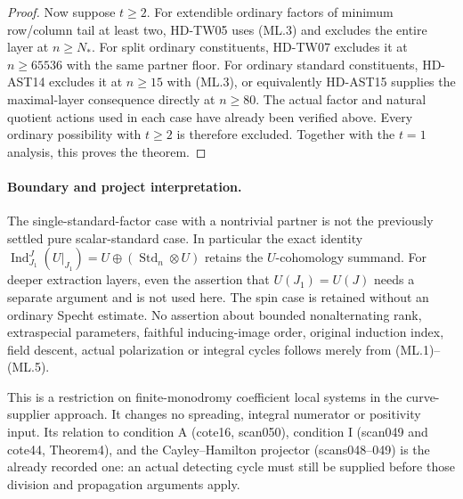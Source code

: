 \begin{proof}
Now suppose $t\ge2$. For extendible ordinary factors of minimum
row/column tail at least two, HD-TW05 uses (ML.3) and excludes the
entire layer at $n\ge N_*$. For split ordinary constituents,
HD-TW07 excludes it at $n\ge65536$ with the same partner floor.
For ordinary standard constituents, HD-AST14 excludes it at
$n\ge15$ with (ML.3), or equivalently HD-AST15 supplies the
maximal-layer consequence directly at $n\ge80$. The actual
factor and natural quotient actions used in each case have
already been verified above. Every ordinary possibility with
$t\ge2$ is therefore excluded. Together with the $t=1$ analysis,
this proves the theorem.
\end{proof}

\paragraph{Boundary and project interpretation.}
The single-standard-factor case with a nontrivial partner is not
the previously settled pure scalar-standard case. In particular
the exact identity
$\operatorname{Ind}_{J_1}^{J}(U|_{J_1})=U\oplus
(\operatorname{Std}_n\otimes U)$ retains the $U$-cohomology
summand. For deeper extraction layers, even the assertion that
$U(J_1)=U(J)$ needs a separate argument and is not used here.
The spin case is retained without an ordinary Specht estimate.
No assertion about bounded nonalternating rank, extraspecial
parameters, faithful inducing-image order, original induction
index, field descent, actual polarization or integral cycles
follows merely from (ML.1)--(ML.5).

This is a restriction on finite-monodromy coefficient local
systems in the curve-supplier approach. It changes no spreading,
integral numerator or positivity input. Its relation to condition A
(cote16, scan050), condition I (scan049 and cote44, Theorem4), and
the Cayley--Hamilton projector (scans048--049) is the already
recorded one: an actual detecting cycle must still be supplied
before those division and propagation arguments apply.
